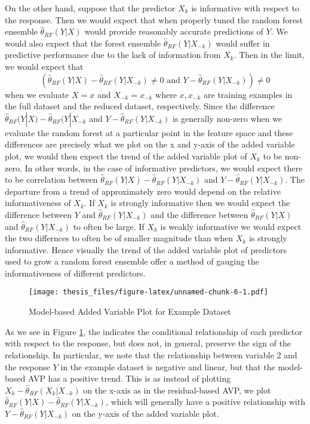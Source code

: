 \documentclass[12pt,twoside]{reedthesis}
\theoremstyle{definition}
\theoremstyle{definition}
\theoremstyle{definition}
\theoremstyle{remark}
\begin{document}
On the other hand, suppose that the predictor \(X_k\) is informative
with respect to the response. Then we would expect that when properly
tuned the random forest ensemble \(\hat{\theta}_{RF}(Y|X)\) would
provide reasonably accurate predictions of \(Y\). We would also expect
that the forest ensemble \(\hat{\theta}_{RF}(Y|X_{-k})\) would suffer in
predictive performance due to the lack of information from \(X_k\). Then
in the limit, we would expect that
\[(\hat{\theta}_{RF}(Y|X)-\hat{\theta}_{RF}(Y|X_{-k})\neq 0 \text{ and } Y-\hat{\theta}_{RF}(Y|X_{-k}))\neq 0\]
when we evaluate \(X=x\) and \(X_{-k}=x_{-k}\) where \(x,x_{-k}\) are
training examples in the full dataset and the reduced dataset,
respectively. Since the difference
\(\hat{\theta}_{RF}(Y|X)-\hat{\theta}_{RF}(Y|X_{-k}\) and
\(Y-\hat{\theta}_{RF}(Y|X_{-k})\) is generally non-zero when we evaluate
the random forest at a particular point in the feature space and these
differences are precisely what we plot on the x and y-axis of the added
variable plot, we would then expect the trend of the added variable plot
of \(X_k\) to be non-zero. In other words, in the case of informative
predictors, we would expect there to be correlation between
\(\hat{\theta}_{RF}(Y|X)-\hat{\theta}_{RF}(Y|X_{-k})\) and
\(Y-\hat{\theta}_{RF}(Y|X_{-k})\). The departure from a trend of
approximately zero would depend on the relative informativeness of
\(X_k\). If \(X_k\) is strongly informative then we would expect the
difference between \(Y\) and \(\hat{\theta}_{RF}(Y|X_{-k})\) and the
difference between \(\hat{\theta}_{RF}(Y|X)\) and
\(\hat{\theta}_{RF}(Y|X_{-k})\) to often be large. If \(X_k\) is weakly
informative we would expect the two differnces to often be of smaller
magnitude than when \(X_k\) is strongly informative. Hence visually the
trend of the added variable plot of predictors used to grow a random
forest ensemble offer a method of gauging the informativeness of
different predictors. \par
\begin{figure}
\centering
\texttt{[image: thesis\_files/figure-latex/unnamed-chunk-6-1.pdf]}
\caption{\label{fig:unnamed-chunk-6}\label{AVPmodex}Model-based Added
Variable Plot for Example Dataset}
\end{figure}
As we see in Figure \ref{AVPmodex}, the indicates the conditional
relationship of each predictor with respect to the response, but does
not, in general, preserve the sign of the relationship. In particular,
we note that the relationship between variable 2 and the response \(Y\)
in the example dataset is negative and linear, but that the model-based
AVP has a positive trend. This is as instead of plotting
\(X_k-\hat{\theta}_{RF}(X_k|X_{-k})\) on the x-axis as in the
residual-based AVP, we plot
\(\hat{\theta}_{RF}(Y|X)-\hat{\theta}_{RF}(Y|X_{-k})\), which will
generally have a positive relationship with
\(Y-\hat{\theta}_{RF}(Y|X_{-k})\) on the y-axis of the added variable
plot. \par 
\end{document}
